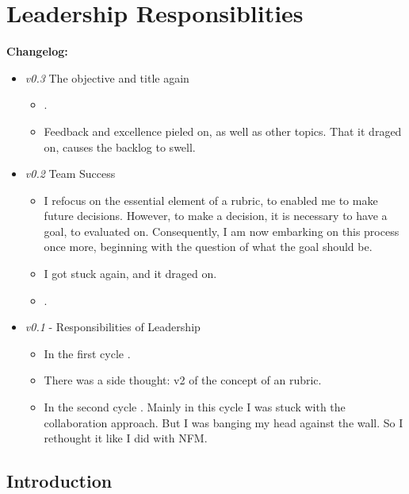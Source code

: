 \chapter{Leadership Responsiblities}
\setcounter{section}{0}

\textbf{Changelog:}\\
\begin{itemize}
	\item \textit{v0.3} The objective and title again
	\begin{itemize}
		\item {}.
		\item Feedback and excellence pieled on, as well as other topics. That it draged on, causes the backlog to swell.
	\end{itemize}
	\item \textit{v0.2} Team Success
	\begin{itemize}
		\item I refocus on the essential element of a rubric, to enabled me to make future decisions. However, to make a decision, it is necessary to have a goal, to evaluated on. Consequently, I am now embarking on this process once more, beginning with the question of what the goal should be.
		\item I got stuck again, and it draged on.
		\item {}.
	\end{itemize}
	\item \textit{v0.1} - Responsibilities of Leadership
	\begin{itemize}
		\item In the first cycle 
		 	 .
		\item There was a side thought: v2 of the concept of an rubric.
		\item In the second cycle 
		 	 . Mainly in this cycle I was stuck with the collaboration approach. But I was banging my head against the wall. So I rethought it like I did with NFM.
	\end{itemize}
\end{itemize}

\pagebreak


\section{Introduction}

